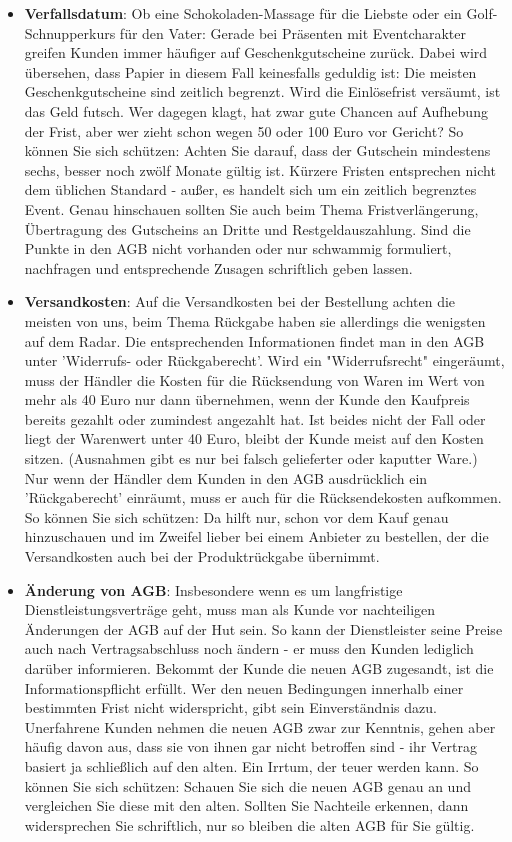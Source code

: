 \documentclass[a4paper]{article}
\begin{document}
\begin{itemize}
\item \textbf{Verfallsdatum}: Ob eine Schokoladen-Massage für die Liebste oder ein Golf-Schnupperkurs für den Vater: Gerade bei Präsenten mit Eventcharakter greifen Kunden immer häufiger auf Geschenkgutscheine zurück. Dabei wird übersehen, dass Papier in diesem Fall keinesfalls geduldig ist: Die meisten Geschenkgutscheine sind zeitlich begrenzt. Wird die Einlösefrist versäumt, ist das Geld futsch. Wer dagegen klagt, hat zwar gute Chancen auf Aufhebung der Frist, aber wer zieht schon wegen 50 oder 100 Euro vor Gericht? So können Sie sich schützen: Achten Sie darauf, dass der Gutschein mindestens sechs, besser noch zwölf Monate gültig ist. Kürzere Fristen entsprechen nicht dem üblichen Standard - außer, es handelt sich um ein zeitlich begrenztes Event. Genau hinschauen sollten Sie auch beim Thema Fristverlängerung, Übertragung des Gutscheins an Dritte und Restgeldauszahlung. Sind die Punkte in den AGB nicht vorhanden oder nur schwammig formuliert, nachfragen und entsprechende Zusagen schriftlich geben lassen.

\item \textbf{Versandkosten}: Auf die Versandkosten bei der Bestellung achten die meisten von uns, beim Thema Rückgabe haben sie allerdings die wenigsten auf dem Radar. Die entsprechenden Informationen findet man in den AGB unter 'Widerrufs- oder Rückgaberecht'. Wird ein "Widerrufsrecht" eingeräumt, muss der Händler die Kosten für die Rücksendung von Waren im Wert von mehr als 40 Euro nur dann übernehmen, wenn der Kunde den Kaufpreis bereits gezahlt oder zumindest angezahlt hat. Ist beides nicht der Fall oder liegt der Warenwert unter 40 Euro, bleibt der Kunde meist auf den Kosten sitzen. (Ausnahmen gibt es nur bei falsch gelieferter oder kaputter Ware.) Nur wenn der Händler dem Kunden in den AGB ausdrücklich ein 'Rückgaberecht' einräumt, muss er auch für die Rücksendekosten aufkommen. So können Sie sich schützen: Da hilft nur, schon vor dem Kauf genau hinzuschauen und im Zweifel lieber bei einem Anbieter zu bestellen, der die Versandkosten auch bei der Produktrückgabe übernimmt.

\item \textbf{Änderung von AGB}: Insbesondere wenn es um langfristige Dienstleistungsverträge geht, muss man als Kunde vor nachteiligen Änderungen der AGB auf der Hut sein. So kann der Dienstleister seine Preise auch nach Vertragsabschluss noch ändern - er muss den Kunden lediglich darüber informieren. Bekommt der Kunde die neuen AGB zugesandt, ist die Informationspflicht erfüllt. Wer den neuen Bedingungen innerhalb einer bestimmten Frist nicht widerspricht, gibt sein Einverständnis dazu. Unerfahrene Kunden nehmen die neuen AGB zwar zur Kenntnis, gehen aber häufig davon aus, dass sie von ihnen gar nicht betroffen sind - ihr Vertrag basiert ja schließlich auf den alten. Ein Irrtum, der teuer werden kann. So können Sie sich schützen: Schauen Sie sich die neuen AGB genau an und vergleichen Sie diese mit den alten. Sollten Sie Nachteile erkennen, dann widersprechen Sie schriftlich, nur so bleiben die alten AGB für Sie gültig.


\end{itemize}
\end{document}
